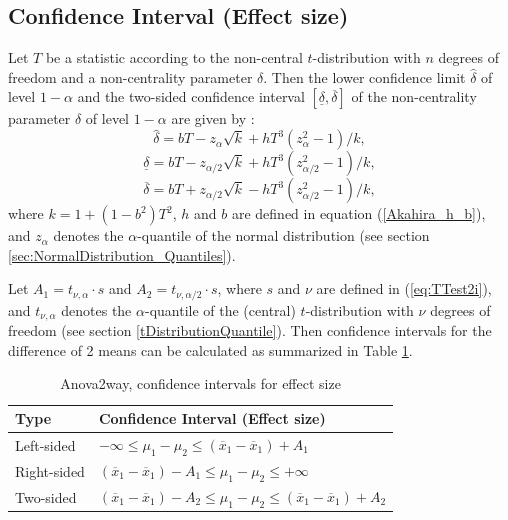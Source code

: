 \subsection{Confidence Interval (Effect size)}


\vspace{0.3cm}
Let $T$ be a statistic according to the non-central $t$-distribution
with $n$ degrees of freedom and a non-centrality parameter $\delta$. Then
the lower confidence limit $\widehat{\delta}$ of level $1-\alpha$ and the two-sided confidence interval $[ \underline{\delta},\overline{\delta}]$ of the
non-centrality parameter $\delta$ of level $1-\alpha$ are given by \cite{akahira_1995}:
\begin{equation}
	\widehat{\delta} = bT - z_\alpha \sqrt{k} +  h T^3 (z_\alpha^2 - 1)/k,
\end{equation} 
\begin{equation}
	\underline{\delta} = bT - z_{\alpha/2} \sqrt{k} +  h T^3 (z_{\alpha/2}^2 - 1)/k,
\end{equation} 
\begin{equation}
	\overline{\delta} = bT + z_{\alpha/2} \sqrt{k} -  h T^3 (z_{\alpha/2}^2 - 1)/k,
\end{equation} 
where $k=1+(1-b^2)T^2$, $h$ and $b$ are defined in equation (\ref{Akahira_h_b}), and $z_\alpha$ denotes the $\alpha$-quantile of the normal distribution (see section \ref{sec:NormalDistribution_Quantiles}).


Let $A_1=t_{\nu,\alpha} \cdot s$ and $A_2=t_{\nu,\alpha/2} \cdot s$, where $s$ and $\nu$ are defined in (\ref{eq:TTest2i}), and $t_{\nu,\alpha}$ denotes the $\alpha$-quantile of the (central) $t$-distribution with $\nu$ degrees of freedom (see section \ref{tDistributionQuantile}). Then confidence intervals for the difference of 2 means can be calculated as summarized in Table \ref{Anova2way, EffectSize}.

\begin{table}[ht]
	\centering
	\begin{tabular}{|l|l|}
		\hline
		Type & Confidence Interval (Effect size)\\
		\hline
		Left-sided &  $-\infty \leq \mu_1 - \mu_2 \leq (\overline{x}_1-\overline{x}_1) + A_1$ \\
		Right-sided &  $(\overline{x}_1-\overline{x}_1) - A_1 \leq \mu_1 - \mu_2 \leq +\infty$\\
		Two-sided & $(\overline{x}_1-\overline{x}_1) - A_2 \leq \mu_1 - \mu_2 \leq (\overline{x}_1-\overline{x}_1) + A_2$ \\
		\hline
	\end{tabular}
	\caption{Anova2way, confidence intervals for effect size}
	\label{Anova2way, EffectSize}
\end{table}




